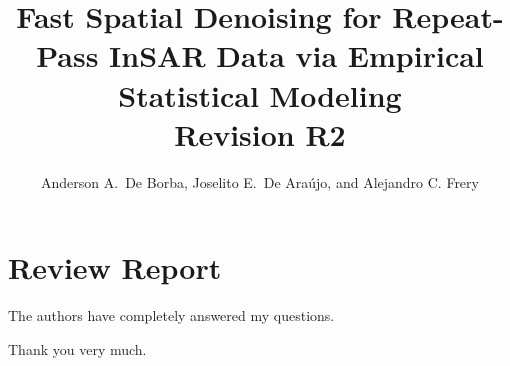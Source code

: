 \documentclass[a4paper,10pt]{article}
\begin{document}
\title{Fast Spatial Denoising for Repeat-Pass InSAR Data via Empirical Statistical Modeling\\
	Revision R2}


\author{Anderson A.\ De Borba,
	Joselito E.\ De Araújo, and
	Alejandro C. Frery}


\maketitle


\section{Review Report}
\begin{tcolorbox}[colback=red!5!white,colframe=red!75!black,title=Review Report]
The authors have completely answered my questions.
\end{tcolorbox}

Thank you very much.
\end{document}
